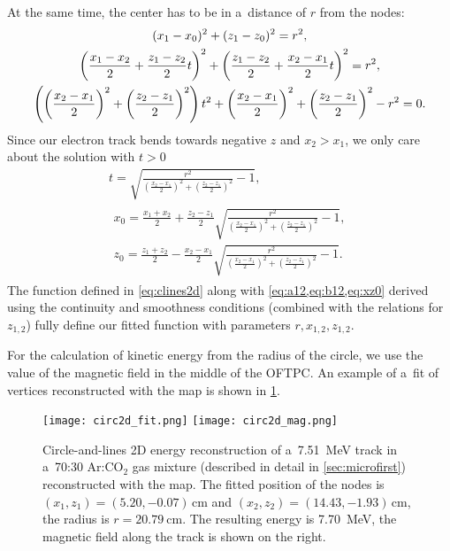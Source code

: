 			At the same time, the center has to be in a~distance of $r$ from the nodes:
				\begin{gather}
					(x_1-x_0)^2 + (z_1-z_0)^2 = r^2,\notag\\
					\left(\frac{x_1-x_2}{2}+\frac{z_1-z_2}{2}t\right)^2 + \left(\frac{z_1-z_2}{2}+\frac{x_2-x_1}{2}t\right)^2 = r^2,\notag\\
					\left(\left(\frac{x_2-x_1}{2}\right)^2+\left(\frac{z_2-z_1}{2}\right)^2\right)t^2+\left(\frac{x_2-x_1}{2}\right)^2+\left(\frac{z_2-z_1}{2}\right)^2-r^2=0.
				\end{gather}
			Since our electron track bends towards negative $z$ and $x_2 > x_1$, we only care about the solution with $t>0$
				\begin{gather}
					t = \sqrt{\frac{r^2}{\left(\frac{x_2-x_1}{2}\right)^2+\left(\frac{z_2-z_1}{2}\right)^2}-1},\\
					\begin{aligned}
						x_0 = \frac{x_1+x_2}{2} + \frac{z_2-z_1}{2} \sqrt{\frac{r^2}{\left(\frac{x_2-x_1}{2}\right)^2+\left(\frac{z_2-z_1}{2}\right)^2}-1},\label{eq:xz0}\\
						z_0 = \frac{z_1+z_2}{2} - \frac{x_2-x_1}{2} \sqrt{\frac{r^2}{\left(\frac{x_2-x_1}{2}\right)^2+\left(\frac{z_2-z_1}{2}\right)^2}-1}.
					\end{aligned}
				\end{gather}
			The function defined in \cref{eq:clines2d} along with \cref{eq:a12,eq:b12,eq:xz0} derived using the continuity and smoothness conditions (combined with the relations for $z_{1,2}$) fully define our fitted function with parameters $r,x_{1,2},z_{1,2}$.
			
			For the calculation of kinetic energy from the radius of the circle, we use the value of the magnetic field in the middle of the \ac{OFTPC}. An example of a~fit of vertices reconstructed with the map is shown in \cref{fig:circle2d}.
			
			\begin{figure}
				\centering
				\texttt{[image: circ2d\_fit.png]}
				\hfill
				\texttt{[image: circ2d\_mag.png]}
				\caption{Circle-and-lines 2D energy reconstruction of a~\qty{7.51}{\MeV} track in a~70:30 Ar:CO$_2$ gas mixture (described in detail in \cref{sec:microfirst}) reconstructed with the map. The fitted position of the nodes is $(x_1,z_1) = (5.20,-0.07)\,\unit{\cm}$ and $(x_2,z_2) = (14.43,-1.93)\,\unit{\cm}$, the radius is $r = \qty{20.79}{\cm}$. The resulting energy is \qty{7.70}{\MeV}, the magnetic field along the track is shown on the right.}
				\label{fig:circle2d}
			\end{figure}
		
